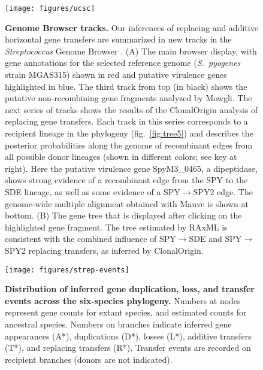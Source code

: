 \documentclass[12pt]{article}
\begin{document}
\begin{figure}%
\begin{center}
\texttt{[image: figures/ucsc]}
\caption{ {\bf Genome Browser tracks.}  Our inferences of replacing and
  additive horizontal gene transfers are summarized in new tracks in the
  {\em Streptococcus} Genome Browser \citep{Suzuki2011}.  (A) The main
  browser display, with gene annotations for the selected reference genome
  ({\em S.\ pyogenes} strain MGAS315) shown in red and putative virulence
  genes highlighted in blue. The third track from top (in black) shows the
  putative non-recombining gene fragments analyzed by Mowgli.  The next series
  of tracks shows the results of the ClonalOrigin analysis of
  replacing gene transfers.  Each track in this series corresponds to a
  recipient lineage in the phylogeny (fig.\ \ref{fig:tree5}) and describes
  the posterior probabilities along the genome of recombinant edges from
  all possible donor lineages (shown in different colors; see key at
  right).  Here the putative virulence gene SpyM3\_0465, a dipeptidase,
  shows strong evidence of a recombinant edge from the SPY to the 
  SDE lineage, as well as some evidence of a SPY$\rightarrow$SPY2 edge.
  The genome-wide multiple alignment obtained with Mauve is shown at
  bottom.  (B) The gene tree that is displayed after clicking on the
  highlighted gene fragment.  The tree estimated by RAxML is consistent
  with the combined influence of SPY$\rightarrow$SDE and
  SPY$\rightarrow$SPY2 replacing transfers, as inferred by ClonalOrigin.}
\label{fig:ucsc}
\end{center}
\end{figure}
\clearpage{}%

\begin{figure}
\begin{center}
\texttt{[image: figures/strep-events]}
\caption{\label{fig:Gene-duplication-loss} {\bf Distribution of inferred
    gene duplication, loss, and transfer events across the six-species
    phylogeny.}  Numbers at nodes represent gene counts for extant species,
  and estimated counts for ancestral species.  Numbers on branches indicate
  inferred gene appearances (A*), duplications (D*), losses (L*), additive
  transfers (T*), and replacing transfers (R*).  Transfer events are
  recorded on recipient branches (donors are not indicated).}
\end{center}
\end{figure}
\clearpage{}%
\end{document}
